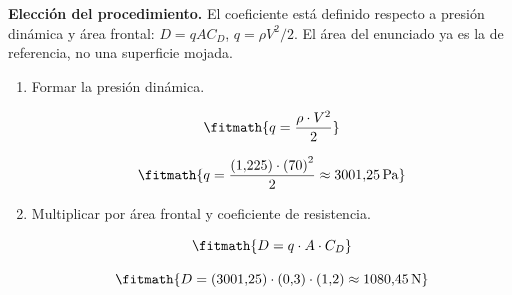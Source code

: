 \noindent\textbf{Elección del procedimiento.} El coeficiente está definido respecto a presión dinámica y área frontal: $D=qAC_D$, $q=\rho V^2/2$. El área del enunciado ya es la de referencia, no una superficie mojada.

\begin{enumerate}

\item Formar la presión dinámica.

\[\fitmath{q=\frac{\rho\cdot {V}^{2}}{2}}\]

\[\fitmath{q=\frac{(1{,}225)\cdot {(70)}^{2}}{2}\approx 3001{,}25\,\mathrm{Pa}}\]

\item Multiplicar por área frontal y coeficiente de resistencia.

\[\fitmath{D=q\cdot A\cdot C_D}\]

\[\fitmath{D=(3001{,}25)\cdot (0{,}3)\cdot (1{,}2)\approx 1080{,}45\,\mathrm{N}}\]

\end{enumerate}
